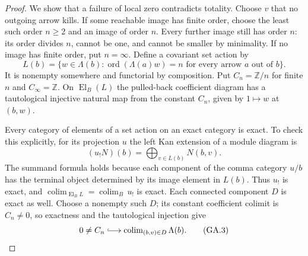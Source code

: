 \begin{proof}
We show that a failure of local zero contradicts totality.
Choose $v$ that no outgoing arrow kills. If some reachable image
has finite order, choose the least such order $n\geq2$ and an
image of order $n$. Every further image still has order $n$:
its order divides $n$, cannot be one, and cannot be smaller by
minimality. If no image has finite order, put $n=\infty$.
Define a covariant set action by
\[
 L(b)=\{w\in\Lambda(b):\operatorname{ord}(\Lambda(a)w)=n
             \text{ for every arrow }a\text{ out of }b\}.
 \tag{GA.2}
\]
It is nonempty somewhere and functorial by composition. Put
$C_n=\mathbb Z/n$ for finite $n$ and $C_\infty=\mathbb Z$.
On $\operatorname{El}_B(L)$ the pulled-back coefficient diagram
has a tautological injective natural map from the constant
$C_n$, given by $1\mapsto w$ at $(b,w)$.

Every category of elements of a set action on an exact category
is exact. To check this explicitly, for its projection $u$ the
left Kan extension of a module diagram is
\[
 (u_!N)(b)=\bigoplus_{v\in L(b)}N(b,v).
\]
The summand formula holds because each component of the comma
category $u/b$ has the terminal object determined by its image
element in $L(b)$. Thus $u_!$ is exact, and
$\operatorname{colim}_{\operatorname{El}_B L}=
\operatorname{colim}_B\,u_!$ is exact. Each connected component
$D$ is exact as well. Choose a nonempty such $D$; its constant
coefficient colimit is $C_n\ne0$, so exactness and the
tautological injection give
\[
 0\ne C_n\lhook\joinrel\longrightarrow
    \operatorname{colim}_{(b,v)\in D}\Lambda(b).
 \tag{GA.3}
\]


\end{proof}
